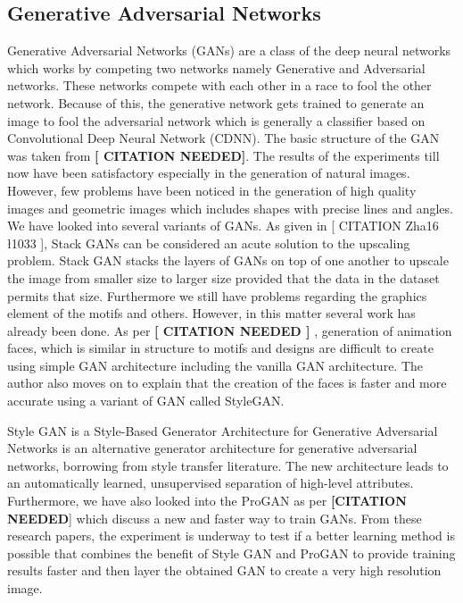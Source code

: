 \documentclass{article}
\begin{document}
\subsection{Generative Adversarial Networks}
Generative Adversarial Networks (GANs) are a class of the deep neural networks which works by competing two networks namely Generative and Adversarial networks. These networks compete with each other in a race to fool the other network. Because of this, the generative network gets trained to generate an image to fool the adversarial network which is generally a classifier based on Convolutional Deep Neural Network (CDNN). The basic structure of the GAN was taken from \textbf{[ CITATION NEEDED]}. \newline
The results of the experiments till now have been satisfactory especially in the generation of natural images. However, few problems have been noticed in the generation of high quality images and geometric images which includes shapes with precise lines and angles.
We have looked into several variants of GANs. As given in [ CITATION Zha16 \l 1033 ], Stack GANs can be considered an acute solution to the upscaling problem. Stack GAN stacks the layers of GANs on top of one another to upscale the image from smaller size to larger size provided that the data in the dataset permits that size.
Furthermore we still have problems regarding the graphics element of the motifs and others. However, in this matter several work has already been done. As per \textbf{[ CITATION NEEDED ]} , generation of animation faces, which is similar in structure to motifs and designs are difficult to create using simple GAN architecture including the vanilla GAN architecture. The author also moves on to explain that the creation of the faces is faster and more accurate using a variant of GAN called StyleGAN.

Style GAN is a Style-Based Generator Architecture for Generative Adversarial Networks is an alternative generator architecture for generative adversarial networks, borrowing from style transfer literature. The new architecture leads to an automatically learned, unsupervised separation of high-level attributes.
Furthermore, we have also looked into the ProGAN as per \textbf{[CITATION NEEDED}] which discuss a new and faster way to train GANs.
From these research papers, the experiment is underway to test if a better learning method is possible that combines the benefit of Style GAN and ProGAN to provide training results faster and then layer the obtained GAN to create a very high resolution image.
\end{document}
